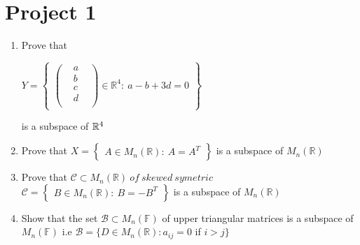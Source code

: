 \documentclass[45pt]{article}
\begin{document}
 \vspace{2.0cmq}


 
\section*{\Huge{Project 1}}
\Large{}
\begin{enumerate}
  \item Prove that 

  
  $ Y \pmb{=} \begin{Bmatrix}
    \begin{pmatrix} 
    & a  \\
    & b & \\
    & c & \\
    & d & \\
    \end{pmatrix} \in \mathbb{R}^4 : ~
    a-b+3d\pmb{=}0
    \end{Bmatrix}$
  
is a subspace of $\mathbb{R}^4\\\\$
  
  \item Prove that 
$X \pmb{=} \begin{Bmatrix}
    A \in M_n(\mathbb{R}): ~ A=A^T
    \end{Bmatrix}$ is a subspace of $ M_n(\mathbb{R})$
\item Prove that
$ \mathcal{C} \subset M_n(\mathbb{R}) ~ of ~ skewed~ symetric$ \\
$\mathcal{C} \pmb{=} \begin{Bmatrix}
    B \in M_n(\mathbb{R}): ~ B=-B^T
	\end{Bmatrix}$
is a subspace of $ M_n(\mathbb{R})$
 \item Show that the set  $\mathcal{B}\subset M_n(\mathbb{F})$ of upper triangular matrices is a subspace of $M_n(\mathbb{F})$ i.e $\mathcal{B}=\{ D \in M_n(\mathbb{R}): a_{ij}=0$ if $ i>j \}$

\end{enumerate}
$ $\\
\end{document}
